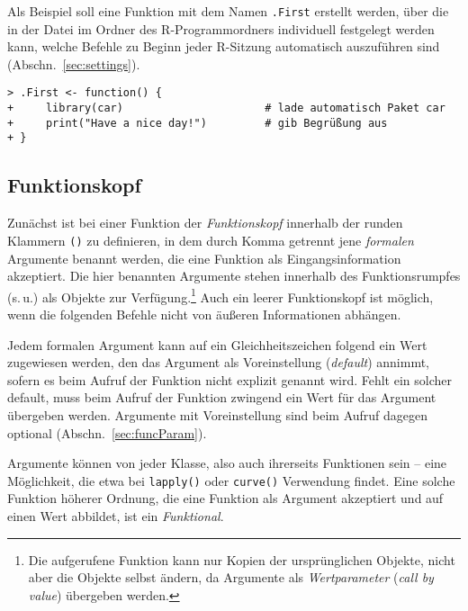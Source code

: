 Als Beispiel soll eine Funktion mit dem Namen \lstinline!.First! erstellt werden, über die in der Datei  im  Ordner des R-Programmordners individuell festgelegt werden kann, welche Befehle zu Beginn jeder R-Sitzung automatisch auszuführen sind (Abschn.\ \ref{sec:settings}).
\begin{lstlisting}
> .First <- function() {
+     library(car)                      # lade automatisch Paket car
+     print("Have a nice day!")         # gib Begrüßung aus
+ }
\end{lstlisting}

\subsection{Funktionskopf}
\label{sec:functionBody}

Zunächst ist bei einer Funktion der \emph{Funktionskopf} innerhalb der runden Klammern \lstinline!()! zu definieren, in dem durch Komma getrennt jene \emph{formalen} Argumente benannt werden, die eine Funktion als Eingangsinformation akzeptiert. Die hier benannten Argumente stehen innerhalb des Funktionsrumpfes (s.\,u.) als Objekte zur Verfügung.\footnote{Die aufgerufene Funktion kann nur Kopien der ursprünglichen Objekte, nicht aber die Objekte selbst ändern, da Argumente als \emph{Wertparameter} (\emph{call by value}) übergeben werden.} Auch ein leerer Funktionskopf ist möglich, wenn die folgenden Befehle nicht von äußeren Informationen abhängen.

Jedem formalen Argument kann auf ein Gleichheitszeichen folgend ein Wert zugewiesen werden, den das Argument als Voreinstellung (\emph{default}) annimmt, sofern es beim Aufruf der Funktion nicht explizit genannt wird. Fehlt ein solcher default, muss beim Aufruf der Funktion zwingend ein Wert für das Argument übergeben werden. Argumente mit Voreinstellung sind beim Aufruf dagegen optional (Abschn.\ \ref{sec:funcParam}).

Argumente können von jeder Klasse, also auch ihrerseits Funktionen sein -- eine Möglichkeit, die etwa bei \lstinline!lapply()! oder \lstinline!curve()! Verwendung findet. Eine solche Funktion höherer Ordnung, die eine Funktion als Argument akzeptiert und auf einen Wert abbildet, ist ein \emph{Funktional}.

